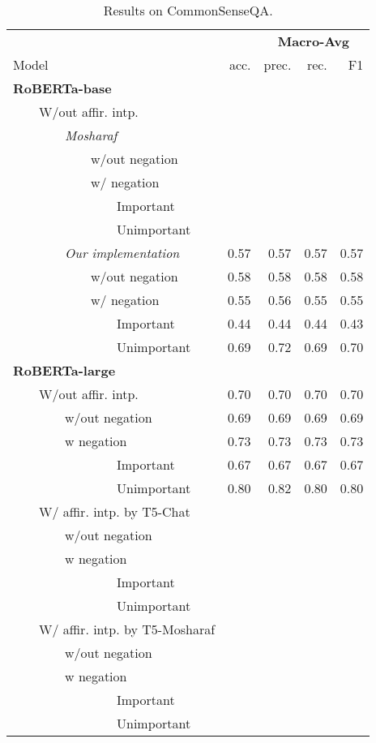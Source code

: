 \begin{table*}
\centering
\begin{tabular}{lrrrr}
\toprule
&& \multicolumn{3}{c}{\textbf{Macro-Avg}} \\
Model & acc. & prec. & rec. & F1 \\
\midrule
\textbf{RoBERTa-base} \\
~~~~W/out affir. intp. \\
~~~~~~~~\textit{Mosharaf} \\
~~~~~~~~~~~~w/out negation \\ 
~~~~~~~~~~~~w/ negation \\ 
~~~~~~~~~~~~~~~~Important \\ 
~~~~~~~~~~~~~~~~Unimportant \\ 
\midrule
~~~~~~~~\textit{Our implementation}  & 0.57 & 0.57 & 0.57 & 0.57 \\ 
~~~~~~~~~~~~w/out negation & 0.58 & 0.58 & 0.58 & 0.58 \\
~~~~~~~~~~~~w/ negation  & 0.55 & 0.56 & 0.55 & 0.55 \\ 
~~~~~~~~~~~~~~~~Important  & 0.44 & 0.44 & 0.44 & 0.43 \\ 
~~~~~~~~~~~~~~~~Unimportant  & 0.69 & 0.72 & 0.69 & 0.70 \\ 
\bottomrule
\textbf{RoBERTa-large} \\
~~~~W/out affir. intp.  & 0.70 & 0.70 & 0.70 & 0.70 \\ 
~~~~~~~~w/out negation  & 0.69 & 0.69 & 0.69 & 0.69 \\
~~~~~~~~w negation  & 0.73 & 0.73 & 0.73 & 0.73 \\ 
~~~~~~~~~~~~~~~~Important  & 0.67 & 0.67 & 0.67 & 0.67 \\  
~~~~~~~~~~~~~~~~Unimportant  & 0.80 & 0.82 & 0.80 & 0.80 \\  
\midrule
~~~~W/ affir. intp. by T5-Chat \\
~~~~~~~~w/out negation \\ 
~~~~~~~~w negation \\ 
~~~~~~~~~~~~~~~~Important \\ 
~~~~~~~~~~~~~~~~Unimportant \\ 
\midrule
~~~~W/ affir. intp. by T5-Mosharaf \\
~~~~~~~~w/out negation \\ 
~~~~~~~~w negation \\ 
~~~~~~~~~~~~~~~~Important \\ 
~~~~~~~~~~~~~~~~Unimportant \\ 
\bottomrule
\end{tabular}
\caption{Results on CommonSenseQA.}
\end{table*}
